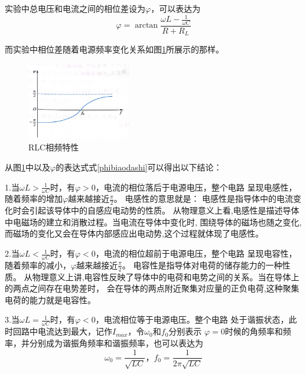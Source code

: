 \documentclass{ctexart}
\begin{document}
  实验中总电压和电流之间的相位差设为$\varphi$，可以表达为
  \begin{equation}\label{phibiaodashi}
    \varphi = \arctan \frac{\omega L-\frac{1}{\omega C}}{R+R_{L}} 
  \end{equation}
  
  而实验中相位差随着电源频率变化关系如图\ref{rlcxiangpintexing}所展示的那样。
  \begin{figure}\label{rlcxiangpintexing}
    \centering
    \includegraphics[width=0.4\textwidth,height=0.3\textheight]{RLCxiangpintexing.jpg}
    \caption{RLC相频特性}
  \end{figure}

  从图\ref{rlcxiangpintexing}中以及$\varphi$的表达式式\ref{phibiaodashi}可以得出以下结论：

  1.\quad  当$\omega L > \frac{1}{\omega C}$时，有$\varphi > 0$，电流的相位落后于电源电压，整个电路
            呈现电感性，随着频率的增加$\varphi$越来越接近$\frac{\pi}{2}$。
            电感性的意思就是：
            电感性是指导体中的电流变化时会引起该导体中的自感应电动势的性质。
            从物理意义上看,电感性是描述导体中电磁场的建立和消散过程。当电流在导体中变化时,
            围绕导体的磁场也随之变化,而磁场的变化又会在导体内部感应出电动势,这个过程就体现了电感性。

  2.\quad  当$\omega L < \frac{1}{\omega C}$时，有$\varphi < 0$，电流的相位超前于电源电压，整个电路
            呈现电容性，随着频率的减小，$\varphi$越来越接近$\frac{\pi}{2}$。
            电容性是指导体对电荷的储存能力的一种性质。
            从物理意义上讲,电容性反映了导体中的电荷和电势之间的关系。当在导体上的两点之间存在电势差时，
            会在导体的两点附近聚集对应量的正负电荷,这种聚集电荷的能力就是电容性。

  3.\quad  当$\omega L = \frac{1}{\omega C}$时，有$\varphi < 0$，电流相位等于电源电压。整个电路
            处于谐振状态，此时回路中电流达到最大，记作$I_{max}$，令$\omega_{0}\mbox{和}f_{0}$分别表示
            $\varphi = 0$时候的角频率和频率，并分别成为谐振角频率和谐振频率，也可以表达为
            \begin{equation}
              \omega_{0}=\frac{1}{\sqrt{LC}} \mbox{，} f_{0}=\frac{1}{2\pi \sqrt{LC}}
            \end{equation}
  
\end{document}
